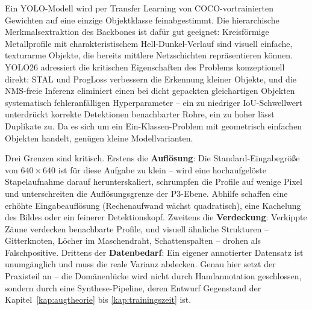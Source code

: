Ein YOLO-Modell wird per Transfer Learning von COCO-vortrainierten Gewichten
\parencite{yosinski2014} auf eine einzige Objektklasse feinabgestimmt. Die
hierarchische Merkmalsextraktion des Backbones ist dafür gut geeignet:
Kreisförmige Metallprofile mit charakteristischem Hell-Dunkel-Verlauf sind
visuell einfache, texturarme Objekte, die bereits mittlere Netzschichten
repräsentieren können. YOLO26 adressiert die kritischen Eigenschaften des
Problems konzeptionell direkt: STAL und ProgLoss verbessern die Erkennung kleiner
Objekte, und die NMS-freie Inferenz eliminiert einen bei dicht gepackten
gleichartigen Objekten systematisch fehleranfälligen Hyperparameter -- ein zu
niedriger IoU-Schwellwert unterdrückt korrekte Detektionen benachbarter Rohre,
ein zu hoher lässt Duplikate zu. Da es sich um ein Ein-Klassen-Problem mit
geometrisch einfachen Objekten handelt, genügen kleine Modellvarianten.

Drei Grenzen sind kritisch. Erstens die \textbf{Auflösung}: Die
Standard-Eingabegröße von $640\times640$ ist für diese Aufgabe zu klein -- wird
eine hochaufgelöste Stapelaufnahme darauf herunterskaliert, schrumpfen die
Profile auf wenige Pixel und unterschreiten die Auflösungsgrenze der P3-Ebene.
Abhilfe schaffen eine erhöhte Eingabeauflösung (Rechenaufwand wächst
quadratisch), eine Kachelung des Bildes \parencite{akyon2022sahi} oder ein
feinerer Detektionskopf. Zweitens die
\textbf{Verdeckung}: Verkippte Zäune verdecken benachbarte Profile, und visuell
ähnliche Strukturen -- Gitterknoten, Löcher im Maschendraht, Schattenspalten --
drohen als Falschpositive. Drittens der \textbf{Datenbedarf}: Ein eigener
annotierter Datensatz ist unumgänglich und muss die reale Varianz abdecken. Genau
hier setzt der Praxisteil an -- die Domänenlücke wird nicht durch Handannotation
geschlossen, sondern durch eine Synthese-Pipeline, deren Entwurf Gegenstand der
Kapitel~\ref{kap:augtheorie} bis \ref{kap:trainingszeit} ist.

